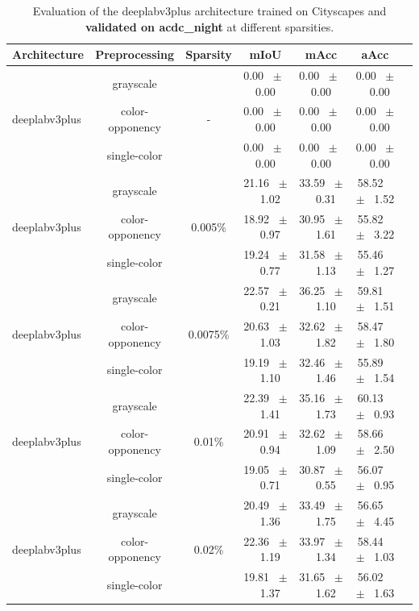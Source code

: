 \begin{table}[h]
  \centering
  \caption{Evaluation of the deeplabv3plus architecture trained on Cityscapes and \textbf{validated on acdc_night} at different sparsities.}
  \begin{tabular}{@{}lccc ccc@{}}
    \toprule
    Architecture & Preprocessing & Sparsity & mIoU & mAcc & aAcc \\
    \midrule
    \midrule
    \midrule
    \multirow{3}{*}{deeplabv3plus} & grayscale & \multirow{3}{*}{-} & 0.00 ~$\pm$~ 0.00 & 0.00 ~$\pm$~ 0.00 & 0.00 ~$\pm$~ 0.00 \\
    & color-opponency & & 0.00 ~$\pm$~ 0.00 & 0.00 ~$\pm$~ 0.00 & 0.00 ~$\pm$~ 0.00 \\
    & single-color & & 0.00 ~$\pm$~ 0.00 & 0.00 ~$\pm$~ 0.00 & 0.00 ~$\pm$~ 0.00 \\
    \midrule
    \multirow{3}{*}{deeplabv3plus} & grayscale & \multirow{3}{*}{0.005\%} & 21.16 ~$\pm$~ 1.02 & 33.59 ~$\pm$~ 0.31 & 58.52 ~$\pm$~ 1.52 \\
    & color-opponency & & 18.92 ~$\pm$~ 0.97 & 30.95 ~$\pm$~ 1.61 & 55.82 ~$\pm$~ 3.22 \\
    & single-color & & 19.24 ~$\pm$~ 0.77 & 31.58 ~$\pm$~ 1.13 & 55.46 ~$\pm$~ 1.27 \\
    \midrule
    \multirow{3}{*}{deeplabv3plus} & grayscale & \multirow{3}{*}{0.0075\%} & 22.57 ~$\pm$~ 0.21 & 36.25 ~$\pm$~ 1.10 & 59.81 ~$\pm$~ 1.51 \\
    & color-opponency & & 20.63 ~$\pm$~ 1.03 & 32.62 ~$\pm$~ 1.82 & 58.47 ~$\pm$~ 1.80 \\
    & single-color & & 19.19 ~$\pm$~ 1.10 & 32.46 ~$\pm$~ 1.46 & 55.89 ~$\pm$~ 1.54 \\
    \midrule
    \multirow{3}{*}{deeplabv3plus} & grayscale & \multirow{3}{*}{0.01\%} & 22.39 ~$\pm$~ 1.41 & 35.16 ~$\pm$~ 1.73 & 60.13 ~$\pm$~ 0.93 \\
    & color-opponency & & 20.91 ~$\pm$~ 0.94 & 32.62 ~$\pm$~ 1.09 & 58.66 ~$\pm$~ 2.50 \\
    & single-color & & 19.05 ~$\pm$~ 0.71 & 30.87 ~$\pm$~ 0.55 & 56.07 ~$\pm$~ 0.95 \\
    \midrule
    \multirow{3}{*}{deeplabv3plus} & grayscale & \multirow{3}{*}{0.02\%} & 20.49 ~$\pm$~ 1.36 & 33.49 ~$\pm$~ 1.75 & 56.65 ~$\pm$~ 4.45 \\
    & color-opponency & & 22.36 ~$\pm$~ 1.19 & 33.97 ~$\pm$~ 1.34 & 58.44 ~$\pm$~ 1.03 \\
    & single-color & & 19.81 ~$\pm$~ 1.37 & 31.65 ~$\pm$~ 1.62 & 56.02 ~$\pm$~ 1.63 \\
    \midrule
    \bottomrule
  \end{tabular}
  \label{tab:sparse_deeplabv3plus_acdc_night}
\end{table}